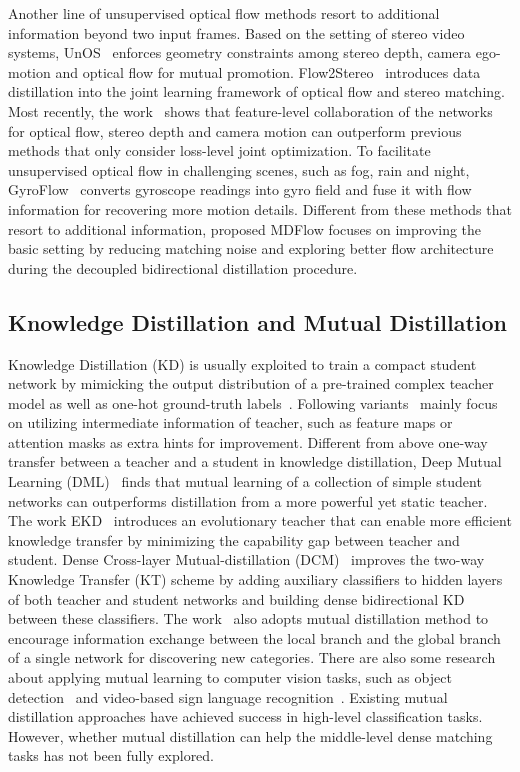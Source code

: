 \documentclass[lettersize,journal]{IEEEtran}
\begin{document}
Another line of unsupervised optical flow methods resort to additional information beyond two input frames. Based on the setting of stereo video systems, UnOS~\cite{Wang_2019_CVPR} enforces geometry constraints among stereo depth, camera ego-motion and optical flow for mutual promotion. Flow2Stereo~\cite{Flow2Stereo} introduces data distillation into the joint learning framework of optical flow and stereo matching. Most recently, the work~\cite{Chi_2021_CVPR} shows that feature-level collaboration of the networks for optical flow, stereo depth and camera motion can outperform previous methods that only consider loss-level joint optimization. To facilitate unsupervised optical flow in challenging scenes, such as fog, rain and night, GyroFlow~\cite{Li_2021_ICCV} converts gyroscope readings into gyro field and fuse it with flow information for recovering more motion details. Different from these methods that resort to additional information, proposed MDFlow focuses on improving the basic setting by reducing matching noise and exploring better flow architecture during the decoupled bidirectional distillation procedure.

\subsection{Knowledge Distillation and Mutual Distillation}
Knowledge Distillation (KD) is usually exploited to train a compact student network by mimicking the output distribution of a pre-trained complex teacher model as well as one-hot ground-truth labels~\cite{44873}. Following variants~\cite{DBLP:journals/corr/RomeroBKCGB14,Zagoruyko2017AT,8953814,tian2019crd} mainly focus on utilizing intermediate information of teacher, such as feature maps or attention masks as extra hints for improvement. Different from above one-way transfer between a teacher and a student in knowledge distillation, Deep Mutual Learning (DML)~\cite{Zhang_2018_CVPR} finds that mutual learning of a collection of simple student networks can outperforms distillation from a more powerful yet static teacher. The work EKD~\cite{9461003} introduces an evolutionary teacher that can enable more efficient knowledge transfer by minimizing the capability gap between teacher and student. Dense Cross-layer Mutual-distillation (DCM)~\cite{10.1007/978-3-030-58555-6_18} improves the two-way Knowledge Transfer (KT) scheme by adding auxiliary classifiers to hidden layers of both teacher and student networks and building dense bidirectional KD between these classifiers. The work~\cite{NEURIPS2021_c203d8a1} also adopts mutual distillation method to encourage information exchange between the local branch and the global branch of a single network for discovering new categories. There are also some research about applying mutual learning to computer vision tasks, such as object detection~\cite{8954274,9577564} and video-based sign language recognition~\cite{9710140}. Existing mutual distillation approaches have achieved success in high-level classification tasks. However, whether mutual distillation can help the middle-level dense matching tasks has not been fully explored.
\end{document}
